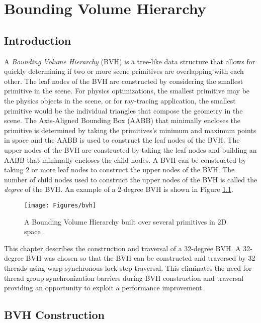 
\chapter{Bounding Volume Hierarchy} %
\label{ch:BoundingVolumeHierarchy}

\section{Introduction}

A \emph{Bounding Volume Hierarchy} (BVH) is a tree-like data structure that allows for quickly determining if two or more scene primitives are overlapping with each other. The leaf nodes of the BVH are constructed by considering the smallest primitive in the scene. For physics optimizations, the smallest primitive may be the physics objects in the scene, or for ray-tracing application, the smallest primitive would be the individual triangles that compose the geometry in the scene. The Axis-Aligned Bounding Box (AABB) that minimally encloses the primitive is determined by taking the primitives's minimum and maximum points in space and the AABB is used to construct the leaf nodes of the BVH. The upper nodes of the BVH are constructed by taking the leaf nodes and building an AABB that minimally encloses the child nodes. A BVH can be constructed by taking 2 or more leaf nodes to construct the upper nodes of the BVH. The number of child nodes used to construct the upper nodes of the BVH is called the \emph{degree} of the BVH. An example of a 2-degree BVH  is shown in Figure \ref{fig:bvh}.

\begin{figure}[h]
\centering
\texttt{[image: Figures/bvh]}
\decoRule
\caption{A Bounding Volume Hierarchy built over several primitives in 2D space \parencite{24_karras_2012}.}
\label{fig:bvh}
\end{figure}

This chapter describes the construction and traversal of a 32-degree BVH. A 32-degree BVH was chosen so that the BVH can be constructed and traversed by 32 threads using warp-synchronous lock-step traversal. This eliminates the need for thread group synchronization barriers during BVH construction and traversal providing an opportunity to exploit a performance improvement.

\section{BVH Construction}
\label{sec:BVHConstruction}

